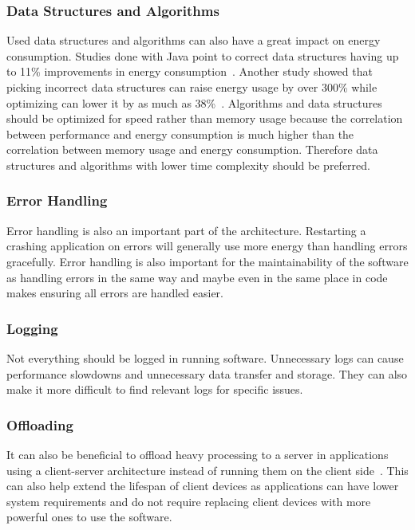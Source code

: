 \subsubsection{Data Structures and Algorithms}
Used data structures and algorithms can also have a great impact on energy consumption. Studies done with Java point to correct data structures having up to 11\% improvements in energy consumption~\cite{influenceofjava}. Another study showed that picking incorrect data structures can raise energy usage by over 300\% while optimizing can lower it by as much as 38\%~\cite{energyprofilesofjavacollections}. Algorithms and data structures should be optimized for speed rather than memory usage because the correlation between performance and energy consumption is much higher than the correlation between memory usage and energy consumption. Therefore data structures and algorithms with lower time complexity should be preferred.

\subsubsection{Error Handling}
 Error handling is also an important part of the architecture. Restarting a crashing application on errors will generally use more energy than handling errors gracefully. Error handling is also important for the maintainability of the software as handling errors in the same way and maybe even in the same place in code makes ensuring all errors are handled easier.
 
 \subsubsection{Logging}\label{logs}
 Not everything should be logged in running software. Unnecessary logs can cause performance slowdowns and unnecessary data transfer and storage. They can also make it more difficult to find relevant logs for specific issues.
 
 \subsubsection{Offloading}
 It can also be beneficial to offload heavy processing to a server in applications using a client-server architecture instead of running them on the client side~\cite{energyefficiencyanewconcern}. This can also help extend the lifespan of client devices as applications can have lower system requirements and do not require replacing client devices with more powerful ones to use the software.
 

